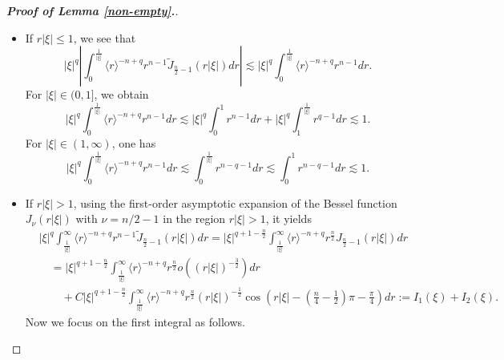 \documentclass[11pt,reqno]{amsart}
\begin{document}
\begin{proof}[\textbf{Proof of Lemma \ref{non-empty}.}]
\begin{itemize}[leftmargin=*]
\item If $r|\xi| \leq 1$, we see that
$$
|\xi|^q \left|\int_0^{\frac{1}{|\xi|}} \langle r\rangle^{-n+q}r^{n-1} \tilde{J}_{\frac{n}{2}-1}(r|\xi|) d r\right| \lesssim |\xi|^q \int_0^{\frac{1}{|\xi|}} \langle r\rangle^{-n+q}r^{n-1} d r.
$$
For $|\xi| \in (0, 1]$, we obtain
$$
|\xi|^q \int_0^{\frac{1}{|\xi|}} \langle r\rangle^{-n+q}r^{n-1} d r\lesssim |\xi|^q \int_0^1 r^{n-1} d r+|\xi|^q \int_1^{\frac{1}{|\xi|}} r^{q-1} d r \lesssim 1.
$$
For $|\xi| \in (1, \infty)$, one has
$$
|\xi|^q \int_0^\frac{1}{|\xi|} \langle r\rangle^{-n+q}r^{n-1} d r\lesssim \int_0^\frac{1}{|\xi|}r^{n-q-1} d r
\lesssim \int_0^1r^{n-q-1} d r \lesssim 1.
$$
\item If $r |\xi| >1$, using the first-order asymptotic expansion of the Bessel function $J_\nu(r|\xi|)$ with $\nu=n/2-1$ in the region $r|\xi|>1$, it yields
\begin{align*}
&|\xi|^q\int_\frac{1}{|\xi|}^\infty \langle r\rangle^{-n+q} r^{n-1}\tilde{J}_{\frac{n}{2}-1}(r|\xi|) d r=|\xi|^{q+1-\frac{n}{2}} \int_\frac{1}{|\xi|}^\infty \langle r\rangle^{-n+q} r^\frac{n}{2} J_{\frac{n}{2}-1}(r|\xi|) d r \\
&\quad=|\xi|^{q+1-\frac{n}{2}} \int_\frac{1}{|\xi|}^\infty \langle r\rangle^{-n+q} r^\frac{n}{2} o\left((r|\xi|)^{-\frac{3}{2}}\right) d r \\
&\qquad+C|\xi|^{q+1-\frac{n}{2}} \int_\frac{1}{|\xi|}^\infty \langle r\rangle^{-n+q} r^\frac{n}{2} (r|\xi|)^{-\frac{1}{2}} \cos\left(r|\xi|-\left(\frac{n}{4}-\frac{1}{2}\right)\pi-\frac{\pi}{4}\right) d r:= I_1(\xi)+ I_2(\xi).
\end{align*}
Now we focus on the first integral as follows.


\end{itemize}
\end{proof}
\end{document}
